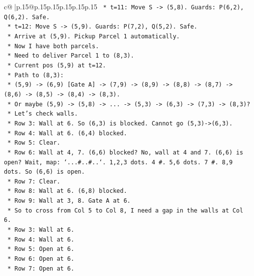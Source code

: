 \documentclass{article}
\begin{document}
{\begin{supertabular}{c@{$\;$}|p{.15\linewidth}@{}p{.15\linewidth}p{.15\linewidth}p{.15\linewidth}p{.15\linewidth}p{.15\linewidth}}
{{{\texttt{            *   t=11: Move S {-}> (5,8). Guards: P(6,2), Q(6,2). Safe.} \\
\texttt{            *   t=12: Move S {-}> (5,9). Guards: P(7,2), Q(5,2). Safe.} \\
\texttt{                *   Arrive at (5,9). Pickup Parcel 1 automatically.} \\
\texttt{            *   Now I have both parcels.} \\
\texttt{            *   Need to deliver Parcel 1 to (8,3).} \\
\texttt{            *   Current pos (5,9) at t=12.} \\
\texttt{            *   Path to (8,3):} \\
\texttt{                *   (5,9) {-}> (6,9) {[}Gate A{]} {-}> (7,9) {-}> (8,9) {-}> (8,8) {-}> (8,7) {-}> (8,6) {-}> (8,5) {-}> (8,4) {-}> (8,3).} \\
\texttt{                *   Or maybe (5,9) {-}> (5,8) {-}> ... {-}> (5,3) {-}> (6,3) {-}> (7,3) {-}> (8,3)?} \\
\texttt{                *   Let's check walls.} \\
\texttt{                *   Row 3: Wall at 6. So (6,3) is blocked. Cannot go (5,3){-}>(6,3).} \\
\texttt{                *   Row 4: Wall at 6. (6,4) blocked.} \\
\texttt{                *   Row 5: Clear.} \\
\texttt{                *   Row 6: Wall at 4, 7. (6,6) blocked? No, wall at 4 and 7. (6,6) is open? Wait, map: `...\#..\#..`. 1,2,3 dots. 4 \#. 5,6 dots. 7 \#. 8,9 dots. So (6,6) is open.} \\
\texttt{                *   Row 7: Clear.} \\
\texttt{                *   Row 8: Wall at 6. (6,8) blocked.} \\
\texttt{                *   Row 9: Wall at 3, 8. Gate A at 6.} \\
\texttt{                *   So to cross from Col 5 to Col 8, I need a gap in the walls at Col 6.} \\
\texttt{                *   Row 3: Wall at 6.} \\
\texttt{                *   Row 4: Wall at 6.} \\
\texttt{                *   Row 5: Open at 6.} \\
\texttt{                *   Row 6: Open at 6.} \\
\texttt{                *   Row 7: Open at 6.} \\
}}}
\end{supertabular}}
\end{document}
